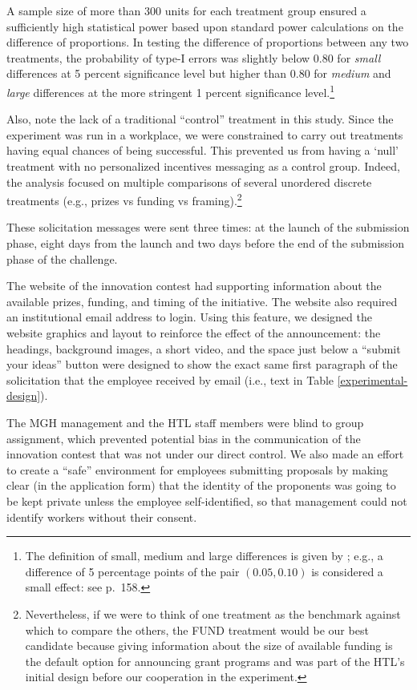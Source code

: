 \documentclass[12pt, titlepage]{article}
\begin{document}
A sample size of more than 300 units for each treatment group ensured a
sufficiently high statistical power based upon standard power
calculations on the difference of proportions. In testing the difference
of proportions between any two treatments, the probability of type-I
errors was slightly below \(0.80\) for \emph{small} differences at 5
percent significance level but higher than \(0.80\) for \emph{medium}
and \emph{large} differences at the more stringent 1 percent
significance level.\footnote{The definition of small, medium and large
  differences is given by \citet{cohen1992power}; e.g., a difference of
  5 percentage points of the pair \((0.05, 0.10)\) is considered a small
  effect: see \citet{cohen1992power} p.~158.}

Also, note the lack of a traditional ``control'' treatment in this
study. Since the experiment was run in a workplace, we were constrained
to carry out treatments having equal chances of being successful. This
prevented us from having a `null' treatment with no personalized
incentives messaging as a control group. Indeed, the analysis focused on
multiple comparisons of several unordered discrete treatments (e.g.,
prizes vs funding vs framing).\footnote{Nevertheless, if we were to
  think of one treatment as the benchmark against which to compare the
  others, the FUND treatment would be our best candidate because giving
  information about the size of available funding is the default option
  for announcing grant programs and was part of the HTL's initial design
  before our cooperation in the experiment.}

These solicitation messages were sent three times: at the launch of the
submission phase, eight days from the launch and two days before the end
of the submission phase of the challenge.

The website of the innovation contest had supporting information about
the available prizes, funding, and timing of the initiative. The website
also required an institutional email address to login. Using this
feature, we designed the website graphics and layout to reinforce the
effect of the announcement: the headings, background images, a short
video, and the space just below a ``submit your ideas'' button were
designed to show the exact same first paragraph of the solicitation that
the employee received by email (i.e., text in Table
\ref{experimental-design}).

The MGH management and the HTL staff members were blind to group
assignment, which prevented potential bias in the communication of the
innovation contest that was not under our direct control. We also made
an effort to create a ``safe'' environment for employees submitting
proposals by making clear (in the application form) that the identity of
the proponents was going to be kept private unless the employee
self-identified, so that management could not identify workers without
their consent.
\end{document}
